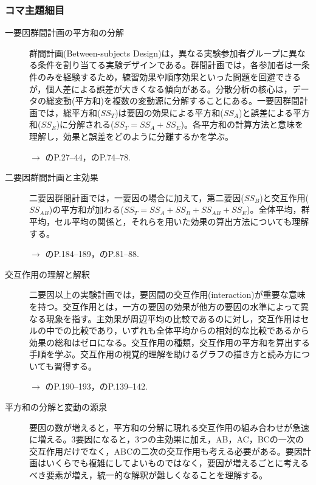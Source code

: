 \subsubsection{コマ主題細目}
\begin{description}
	\item[一要因群間計画の平方和の分解] 群間計画(Between-subjects Design)は，異なる実験参加者グループに異なる条件を割り当てる実験デザインである。群間計画では，各参加者は一条件のみを経験するため，練習効果や順序効果といった問題を回避できるが，個人差による誤差が大きくなる傾向がある。分散分析の核心は，データの総変動(平方和)を複数の変動源に分解することにある。一要因群間計画では，総平方和($SS_T$)は要因の効果による平方和($SS_A$)と誤差による平方和($SS_E$)に分解される($SS_T = SS_A + SS_E$)。各平方和の計算方法と意味を理解し，効果と誤差をどのように分離するかを学ぶ。
	      \begin{flushright}
		      $\to$ \textcite{Toyoda201706}のP.27--44，\textcite{kosugi2018}のP.74--78.
	      \end{flushright}

	\item[二要因群間計画と主効果] 二要因群間計画では，一要因の場合に加えて，第二要因($SS_B$)と交互作用($SS_{AB}$)の平方和が加わる($SS_T = SS_A + SS_B + SS_{AB} + SS_E$)。全体平均，群平均，セル平均の関係と，それらを用いた効果の算出方法についても理解する。
	      \begin{flushright}
		      $\to$ \textcite{Yamada2004}のP.184--189，\textcite{kosugi2018}のP.81--88.
	      \end{flushright}


	\item[交互作用の理解と解釈] 二要因以上の実験計画では，要因間の交互作用(interaction)が重要な意味を持つ。交互作用とは，一方の要因の効果が他方の要因の水準によって異なる現象を指す。主効果が周辺平均の比較であるのに対し，交互作用はセルの中での比較であり，いずれも全体平均からの相対的な比較であるから効果の総和はゼロになる。交互作用の種類，交互作用の平方和を算出する手順を学ぶ。交互作用の視覚的理解を助けるグラフの描き方と読み方についても習得する。
	      \begin{flushright}
		      $\to$ \textcite{Yamada2004}のP.190--193，\textcite{kosugi2019}のP.139--142.
	      \end{flushright}

	\item[平方和の分解と変動の源泉] 要因の数が増えると，平方和の分解に現れる交互作用の組み合わせが急速に増える。3要因になると，3つの主効果に加え，AB，AC，BCの一次の交互作用だけでなく，ABCの二次の交互作用も考える必要がある。要因計画はいくらでも複雑にしてよいものではなく，要因が増えるごとに考えるべき要素が増え，統一的な解釈が難しくなることを理解する。


\end{description}
